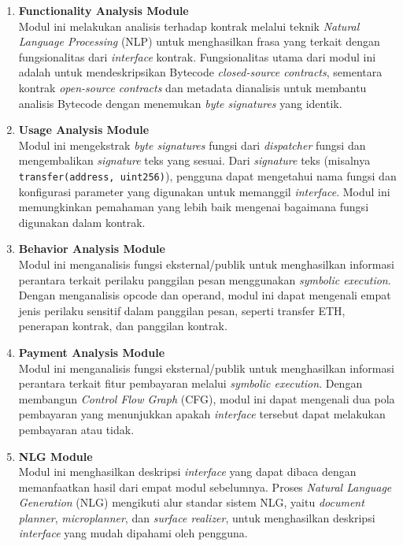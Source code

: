 \begin{enumerate}
	\item \textbf{Functionality Analysis Module} \\
	      Modul ini melakukan analisis terhadap kontrak melalui teknik \textit{Natural Language Processing} (NLP) untuk menghasilkan frasa yang terkait dengan fungsionalitas dari \textit{interface} kontrak. Fungsionalitas utama dari modul ini adalah untuk mendeskripsikan Bytecode \textit{closed-source contracts}, sementara kontrak \textit{open-source contracts} dan metadata dianalisis untuk membantu analisis Bytecode dengan menemukan \textit{byte signatures} yang identik.

	\item \textbf{Usage Analysis Module} \\
	      Modul ini mengekstrak \textit{byte signatures} fungsi dari \textit{dispatcher} fungsi dan mengembalikan \textit{signature} teks yang sesuai. Dari \textit{signature} teks (misalnya \texttt{transfer(address, uint256)}), pengguna dapat mengetahui nama fungsi dan konfigurasi parameter yang digunakan untuk memanggil \textit{interface}. Modul ini memungkinkan pemahaman yang lebih baik mengenai bagaimana fungsi digunakan dalam kontrak.

	\item \textbf{Behavior Analysis Module} \\
	      Modul ini menganalisis fungsi eksternal/publik untuk menghasilkan informasi perantara terkait perilaku panggilan pesan menggunakan \textit{symbolic execution}. Dengan menganalisis opcode dan operand, modul ini dapat mengenali empat jenis perilaku sensitif dalam panggilan pesan, seperti transfer ETH, penerapan kontrak, dan panggilan kontrak.

	\item \textbf{Payment Analysis Module} \\
	      Modul ini menganalisis fungsi eksternal/publik untuk menghasilkan informasi perantara terkait fitur pembayaran melalui \textit{symbolic execution}. Dengan membangun \textit{Control Flow Graph} (CFG), modul ini dapat mengenali dua pola pembayaran yang menunjukkan apakah \textit{interface} tersebut dapat melakukan pembayaran atau tidak.

	\item \textbf{NLG Module} \\
	      Modul ini menghasilkan deskripsi \textit{interface} yang dapat dibaca dengan memanfaatkan hasil dari empat modul sebelumnya. Proses \textit{Natural Language Generation} (NLG) mengikuti alur standar sistem NLG, yaitu \textit{document planner}, \textit{microplanner}, dan \textit{surface realizer}, untuk menghasilkan deskripsi \textit{interface} yang mudah dipahami oleh pengguna.
\end{enumerate}

